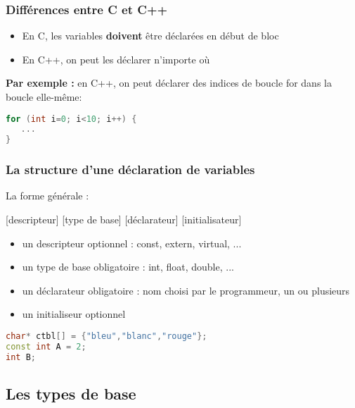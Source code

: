 \documentclass{beamer}
\begin{document}
\begin{frame}[fragile=singleslide,shrink=20]
\frametitle {Différences entre C et C++}

\begin{itemize}

\item{En C, les variables \textbf{doivent} être déclarées en début de bloc}
\item{En C++, on peut les déclarer n'importe où}
\end{itemize}  
 
\textbf{Par exemple :} en C++, on peut déclarer des indices de boucle for dans la boucle elle-même: 

\begin{lstlisting}[language=c++]
for (int i=0; i<10; i++) {
   ...
}
\end{lstlisting}
\end{frame}

\begin{frame}[fragile=singleslide,shrink=20]
\frametitle {La structure d'une déclaration de variables}

La forme générale :
\begin{block}{}
[descripteur] [type de base] [déclarateur] [initialisateur]
\end{block}

\begin{itemize}
\item{un descripteur optionnel : const, extern, virtual, ...}
\item{un type de base obligatoire : int, float, double, ...}
\item{un déclarateur obligatoire : nom choisi par le programmeur, un ou plusieurs}
\item{un initialiseur optionnel}
\end{itemize}

\begin{lstlisting}[language=c++]
char* ctbl[] = {"bleu","blanc","rouge"}; 
const int A = 2;
int B; 
\end{lstlisting}
\end{frame}

\subsection{Les types de base}
\end{document}
